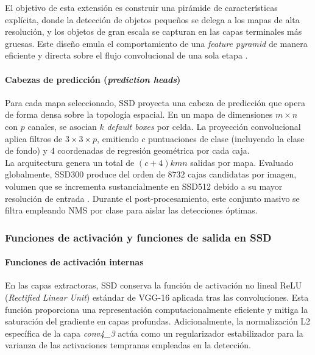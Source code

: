 El objetivo de esta extensión es construir una pirámide de características explícita, donde la detección de objetos pequeños se delega a los mapas de alta resolución, y los objetos de gran escala se capturan en las capas terminales más gruesas. Este diseño emula el comportamiento de una \textit{feature pyramid} de manera eficiente y directa sobre el flujo convolucional de una sola etapa \cite{liu2016ssd}.\\

\paragraph{Cabezas de predicción (\textit{prediction heads})}

Para cada mapa seleccionado, SSD proyecta una cabeza de predicción que opera de forma densa sobre la topología espacial. En un mapa de dimensiones $m\times n$ con $p$ canales, se asocian $k$ \textit{default boxes} por celda. La proyección convolucional aplica filtros de $3\times3\times p$, emitiendo $c$ puntuaciones de clase (incluyendo la clase de fondo) y $4$ coordenadas de regresión geométrica por cada caja.\\

La arquitectura genera un total de $(c+4)kmn$ salidas por mapa. Evaluado globalmente, SSD300 produce del orden de $8732$ cajas candidatas por imagen, volumen que se incrementa sustancialmente en SSD512 debido a su mayor resolución de entrada \cite{liu2016ssd}. Durante el post-procesamiento, este conjunto masivo se filtra empleando NMS por clase para aislar las detecciones óptimas.\\

\subsubsection{Funciones de activación y funciones de salida en SSD}

\paragraph{Funciones de activación internas}

En las capas extractoras, SSD conserva la función de activación no lineal ReLU (\textit{Rectified Linear Unit}) estándar de VGG-16 aplicada tras las convoluciones. Esta función proporciona una representación computacionalmente eficiente y mitiga la saturación del gradiente en capas profundas. Adicionalmente, la normalización L2 específica de la capa \textit{conv4\_3} actúa como un regularizador estabilizador para la varianza de las activaciones tempranas empleadas en la detección.\\

